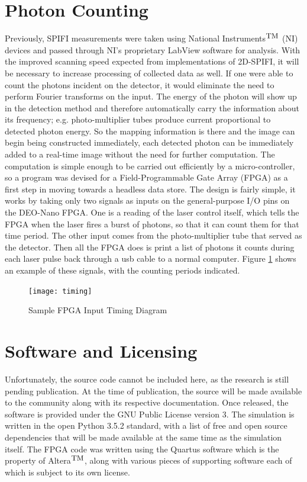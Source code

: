 \documentclass[12pt]{article}
\begin{document}
\section*{Photon Counting}
Previously, SPIFI measurements were taken using National Instruments$^\textnormal{\small TM}$ (NI) devices and passed through NI's proprietary LabView software for analysis. With the improved scanning speed expected from implementations of 2D-SPIFI, it will be necessary to increase processing of collected data as well. If one were able to count the photons incident on the detector, it would eliminate the need to perform Fourier transforms on the input. The energy of the photon will show up in the detection method  and therefore automatically carry the information about its frequency; e.g. photo-multiplier tubes produce current proportional to detected photon energy. So the mapping information is there and the image can begin being constructed immediately, each detected photon can be immediately added to a real-time image without the need for further computation. The computation is simple enough to be carried out efficiently by a micro-controller, so a program was devised for a Field-Programmable Gate Array (FPGA) as a first step in moving towards a headless data store. The design is fairly simple, it works by taking only two signals as inputs on the general-purpose I/O pins on the DEO-Nano FPGA. One is a reading of the laser control itself, which tells the FPGA when the laser fires a burst of photons, so that it can count them for that time period. The other input comes from the photo-multiplier tube that served as the detector. Then all the FPGA does is print a list of photons it counts during each laser pulse back through a usb cable to a normal computer. Figure \ref{fig:timing} shows an example of these signals, with the counting periods indicated.

\begin{figure}[ht]
	\centering
	\texttt{[image: timing]}
	\caption{Sample FPGA Input Timing Diagram}
	\label{fig:timing}
\end{figure}


\section*{Software and Licensing}
Unfortunately, the source code cannot be included here, as the research is still pending publication. At the time of publication, the source will be made available to the community along with its respective documentation.
Once released, the software is provided under the GNU Public License version 3. The simulation is written in the open Python 3.5.2 standard, with a list of free and open source dependencies that will be made available at the same time as the simulation itself. The FPGA code was written using the Quartus software which is the property of Altera$^\textnormal{\small TM}$, along with various pieces of supporting software each of which is subject to its own license. 
\end{document}
